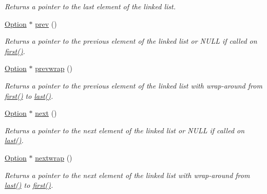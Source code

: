 \begin{DoxyCompactItemize}
\begin{DoxyCompactList}\small\item\em Returns a pointer to the last element of the linked list. \end{DoxyCompactList}\item 
\hyperlink{classxmem_1_1config_1_1third__party_1_1_option}{Option} $\ast$ \hyperlink{classxmem_1_1config_1_1third__party_1_1_option_a51c55046e8f111be3e329f798d0f72b9}{prev} ()
\begin{DoxyCompactList}\small\item\em Returns a pointer to the previous element of the linked list or N\-U\-L\-L if called on \hyperlink{classxmem_1_1config_1_1third__party_1_1_option_a6c8907c4faaf8c099d556db54bfca1a5}{first()}. \end{DoxyCompactList}\item 
\hyperlink{classxmem_1_1config_1_1third__party_1_1_option}{Option} $\ast$ \hyperlink{classxmem_1_1config_1_1third__party_1_1_option_a66a85758180b4b833dfd6574ba1a2246}{prevwrap} ()
\begin{DoxyCompactList}\small\item\em Returns a pointer to the previous element of the linked list with wrap-\/around from \hyperlink{classxmem_1_1config_1_1third__party_1_1_option_a6c8907c4faaf8c099d556db54bfca1a5}{first()} to \hyperlink{classxmem_1_1config_1_1third__party_1_1_option_a79bd212eaf002df298da1b3b46e34cea}{last()}. \end{DoxyCompactList}\item 
\hyperlink{classxmem_1_1config_1_1third__party_1_1_option}{Option} $\ast$ \hyperlink{classxmem_1_1config_1_1third__party_1_1_option_af9c5d2de03863bbcdc05a1d6771f1f36}{next} ()
\begin{DoxyCompactList}\small\item\em Returns a pointer to the next element of the linked list or N\-U\-L\-L if called on \hyperlink{classxmem_1_1config_1_1third__party_1_1_option_a79bd212eaf002df298da1b3b46e34cea}{last()}. \end{DoxyCompactList}\item 
\hyperlink{classxmem_1_1config_1_1third__party_1_1_option}{Option} $\ast$ \hyperlink{classxmem_1_1config_1_1third__party_1_1_option_ae4da74e185cee05d6e3eeda723b39b50}{nextwrap} ()
\begin{DoxyCompactList}\small\item\em Returns a pointer to the next element of the linked list with wrap-\/around from \hyperlink{classxmem_1_1config_1_1third__party_1_1_option_a79bd212eaf002df298da1b3b46e34cea}{last()} to \hyperlink{classxmem_1_1config_1_1third__party_1_1_option_a6c8907c4faaf8c099d556db54bfca1a5}{first()}. \end{DoxyCompactList}\item 

\end{DoxyCompactItemize}
